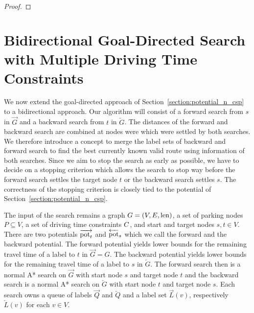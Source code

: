 \begin{proof}
\end{proof}

\section{Bidirectional Goal-Directed Search with Multiple Driving Time Constraints\label{sec:bidir_astar}}
We now extend the goal-directed approach of Section~\ref{section:potential_n_csp} to a bidirectional approach. Our algorithm will consist of a forward search from $s$ in $\overrightarrow{G}$ and a backward search from $t$ in $\overleftarrow{G}$. The distances of the forward and backward search are combined at nodes were which were settled by both searches. We therefore introduce a concept to merge the label sets of backward and forward search to find the best currently known valid route using information of both searches. Since we aim to stop the search as early as possible, we have to decide on a stopping criterion which allows the search to stop way before the forward search settles the target node $t$ or the backward search settles $s$. The correctness of the stopping criterion is closely tied to the potential of Section~\ref{section:potential_n_csp}.

The input of the search remains a graph $G=(V,E,\operatorname{len})$, a set of parking nodes $P \subseteq V$, a set of driving time constraints $C$, and start and target nodes $s,t \in V$. There are two potentials $\overrightarrow{\operatorname{pot}_t}$ and $\overleftarrow{\operatorname{pot}}_s$ which we call the forward and the backward potential. The forward potential yields lower bounds for the remaining travel time of a label to $t$ in $\overrightarrow{G}=G$. The backward potential yields lower bounds for the remaining travel time of a label to $s$ in $\overleftarrow{G}$. The forward search then is a normal A* search on $\overrightarrow{G}$ with start node $s$ and target node $t$ and the backward search is a normal A* search on $\overleftarrow{G}$ with start node $t$ and target node $s$. Each search owns a queue of labels $\overrightarrow{Q}$ and $\overleftarrow{Q}$ and a label set $\overrightarrow{L}(v)$, respectively $\overleftarrow{L}(v)$ for each $v \in V$.

